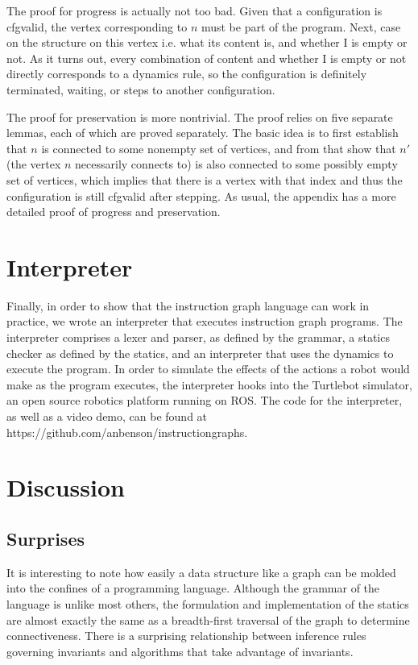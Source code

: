 \documentclass{sig-alternate-05-2015}
\begin{document}
The proof for progress is actually not too bad. Given that a configuration is
cfgvalid, the vertex corresponding to $n$ must be part of the program. Next,
case on the structure on this vertex i.e. what its content is, and whether I is
empty or not. As it turns out, every combination of content and whether I is
empty or not directly corresponds to a dynamics rule, so the configuration is
definitely terminated, waiting, or steps to another configuration.

The proof for preservation is more nontrivial. The proof relies on five separate
lemmas, each of which are proved separately. The basic idea is to first
establish that $n$ is connected to some nonempty set of vertices, and from that
show that $n'$ (the vertex $n$ necessarily connects to) is also connected to
some possibly empty set of vertices, which implies that there is a vertex with
that index and thus the configuration is still cfgvalid after stepping. As
usual, the appendix has a more detailed proof of progress and preservation.

\section{Interpreter}

Finally, in order to show that the instruction graph language can work in
practice, we wrote an interpreter that executes instruction graph programs. The
interpreter comprises a lexer and parser, as defined by the grammar, a statics
checker as defined by the statics, and an interpreter that uses the dynamics to
execute the program. In order to simulate the effects of the actions a robot
would make as the program executes, the interpreter hooks into the Turtlebot
simulator, an open source robotics platform running on ROS. The code for the
interpreter, as well as a video demo, can be found at https://github.com/anbenson/instructiongraphs.

\section{Discussion}

\subsection{Surprises}

It is interesting to note how easily a data structure like a graph can be molded
into the confines of a programming language. Although the grammar of the
language is unlike most others, the formulation and implementation of the
statics are almost exactly the same as a breadth-first traversal of the graph to
determine connectiveness. There is a surprising relationship between inference
rules governing invariants and algorithms that take advantage of invariants.
\end{document}
